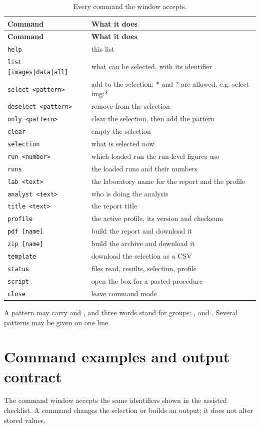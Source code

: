 {\small
\begin{xltabular}{\linewidth}{|X|l|}
\caption{Every command the window accepts.}\label{tab:cmd-commands} \\
\toprule \textbf{Command} & \textbf{What it does} \\\midrule\endfirsthead
\toprule \textbf{Command} & \textbf{What it does} \\\midrule\endhead
\texttt{help} & this list \\
\texttt{list [images|data|all]} & what can be selected, with its identifier \\
\texttt{select <pattern>} & add to the selection; * and ? are allowed, e.g. select img:* \\
\texttt{deselect <pattern>} & remove from the selection \\
\texttt{only <pattern>} & clear the selection, then add the pattern \\
\texttt{clear} & empty the selection \\
\texttt{selection} & what is selected now \\
\texttt{run <number>} & which loaded run the run-level figures use \\
\texttt{runs} & the loaded runs and their numbers \\
\texttt{lab <text>} & the laboratory name for the report and the profile \\
\texttt{analyst <text>} & who is doing the analysis \\
\texttt{title <text>} & the report title \\
\texttt{profile} & the active profile, its version and checksum \\
\texttt{pdf [name]} & build the report and download it \\
\texttt{zip [name]} & build the archive and download it \\
\texttt{template} & download the selection as a CSV \\
\texttt{status} & files read, results, selection, profile \\
\texttt{script} & open the box for a pasted procedure \\
\texttt{close} & leave command mode \\
\bottomrule
\end{xltabular}}


A pattern may carry \vfn{*} and , and three words stand for groups:
,  and . Several patterns may be given on one line.


\section{Command examples and output contract}
The command window accepts the same identifiers shown in the assisted checklist. A command changes the selection or builds an output; it does not alter stored values.

